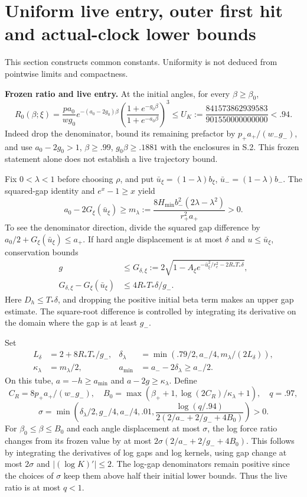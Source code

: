 \documentclass[11pt,a4paper]{article}
\begin{document}
\section{Uniform live entry, outer first hit and actual-clock lower bounds}

This section constructs common constants. Uniformity is not deduced from pointwise limits and compactness.

\textbf{Frozen ratio and live entry.} At the initial angles, for every $\beta\ge\beta_0$,
\[
 R_0(\beta;\xi)=\frac{pa_0}{wg_0}e^{-(a_0-2g_0)\beta}
       \left(\frac{1+e^{-g_0\beta}}{1+e^{-a_0\beta}}\right)^3
 \le U_K:=\frac{841573862939583}{901550000000000}<.94 .
\]
Indeed drop the denominator, bound its remaining prefactor by $p_+a_+/(w_-g_-)$, and use $a_0-2g_0>1$, $\beta\ge.99$, $g_0\beta\ge.1881$ with the enclosures in S.2. This frozen statement alone does not establish a live trajectory bound.

Fix $0<\lambda<1$ before choosing $\rho$, and put $\bar u_\xi=(1-\lambda)b_\xi$, $\bar u_-=(1-\lambda)b_-$. The squared-gap identity and $e^x-1\ge x$ yield
\[
 a_0-2G_\xi(\bar u_\xi)\ge
 m_\lambda:=\frac{8H_{\min}b_-^2(2\lambda-\lambda^2)}{r_+^2a_+}>0 .
\]
To see the denominator direction, divide the squared gap difference by $a_0/2+G_\xi(\bar u_\xi)\le a_+$. If hard angle displacement is at most $\delta$ and $u\le\bar u_\xi$, conservation bounds
\[
\begin{aligned}
 g&\le G_{\delta,\xi}:=2\sqrt{1-A_\xi e^{-\bar u_\xi^2/r_e^2-2R_*T_*\delta}},\\
 G_{\delta,\xi}-G_\xi(\bar u_\xi)&\le4R_*T_*\delta/g_- .
\end{aligned}
\]
Here $D_h\le T_*\delta$, and dropping the positive initial beta term makes an upper gap estimate. The square-root difference is controlled by integrating its derivative on the domain where the gap is at least $g_-$.

Set
\[
\begin{aligned}
 L_\delta&=2+8R_*T_*/g_-,&
 \delta_\lambda&=\min(.79/2,a_-/4,m_\lambda/(2L_\delta)),\\
 \kappa_\lambda&=m_\lambda/2,& a_{\min}&=a_--2\delta_\lambda\ge a_-/2 .
\end{aligned}
\]
On this tube, $a=-h\ge a_{\min}$ and $a-2g\ge\kappa_\lambda$. Define
\[
 C_R=8p_+a_+/(w_-g_-),\quad
 B_0=\max(\beta_++1,\log(2C_R)/\kappa_\lambda+1),\quad q=.97,
\]
\[
 \sigma=\min\left(\delta_\lambda/2,g_-/4,a_-/4,.01,
 \frac{\log(q/.94)}{2(2/a_-+2/g_-+4B_0)}\right)>0 .
\]
For $\beta_0\le\beta\le B_0$ and each angle displacement at most $\sigma$, the log force ratio changes from its frozen value by at most $2\sigma(2/a_-+2/g_-+4B_0)$. This follows by integrating the derivatives of log gaps and log kernels, using gap change at most $2\sigma$ and $|(\log K)'|\le2$. The log-gap denominators remain positive since the choices of $\sigma$ keep them above half their initial lower bounds. Thus the live ratio is at most $q<1$.
\end{document}
